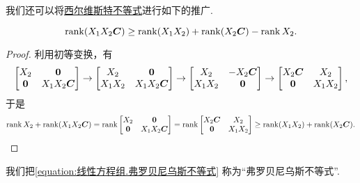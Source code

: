 我们还可以将\hyperref[equation:线性方程组.西尔维斯特不等式]{西尔维斯特不等式}进行如下的推广.
\begin{theorem}
\begin{equation}\label{equation:线性方程组.弗罗贝尼乌斯不等式}
	\rank(X_1X_2\boldsymbol{C}) \geq \rank(X_1X_2) + \rank(X_2\boldsymbol{C}) - \rank X_2.
\end{equation}
\begin{proof}
利用初等变换，有\[
	\begin{bmatrix}
		X_2 & \boldsymbol{0} \\
		\boldsymbol{0} & X_1X_2\boldsymbol{C}
	\end{bmatrix}
	\to \begin{bmatrix}
		X_2 & \boldsymbol{0} \\
		X_1X_2 & X_1X_2\boldsymbol{C}
	\end{bmatrix}
	\to \begin{bmatrix}
		X_2 & -X_2\boldsymbol{C} \\
		X_1X_2 & \boldsymbol{0}
	\end{bmatrix}
	\to \begin{bmatrix}
		X_2\boldsymbol{C} & X_2 \\
		\boldsymbol{0} & X_1X_2
	\end{bmatrix},
\]
于是\[
	\rank X_2 + \rank(X_1X_2\boldsymbol{C})
	= \rank\begin{bmatrix}
		X_2 & \boldsymbol{0} \\
		\boldsymbol{0} & X_1X_2\boldsymbol{C}
	\end{bmatrix}
	= \rank\begin{bmatrix}
		X_2\boldsymbol{C} & X_2 \\
		\boldsymbol{0} & X_1X_2
	\end{bmatrix}
	\geq \rank(X_1X_2) + \rank(X_2\boldsymbol{C}).
	\qedhere
\]
\end{proof}
\end{theorem}

我们把\cref{equation:线性方程组.弗罗贝尼乌斯不等式} 称为“弗罗贝尼乌斯不等式”.

